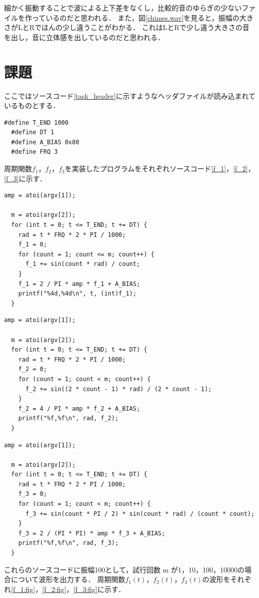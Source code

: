 \documentclass[titlepage]{jarticle}
\begin{document}
細かく振動することで波による上下差をなくし，比較的音のゆらぎの少ないファイルを作っているのだと思われる．
また，図\ref{chimes.wav}を見ると，振幅の大きさがLとRでほんの少し違うことがわかる．
これはLとRで少し違う大きさの音を出し，音に立体感を出しているのだと思われる．

\section{課題}
ここではソースコード\ref{task_header}に示すようなヘッダファイルが読み込まれているものとする．
\begin{lstlisting}[caption=課題のヘッダファイル,label=task_header]
  #define T_END 1000
  #define DT 1
  #define A_BIAS 0x80
  #define FRQ 3
\end{lstlisting}
周期関数$f_{1}$，$f_{2}$，$f_{3}$を実装したプログラムをそれぞれソースコード\ref{f_1}，\ref{f_2}，\ref{f_3}に示す．
\begin{lstlisting}[caption=周期関数$f_{1}(t)$の主要部,label=f_1]
  amp = atoi(argv[1]);

  m = atoi(argv[2]);
  for (int t = 0; t <= T_END; t += DT) {
    rad = t * FRQ * 2 * PI / 1000;
    f_1 = 0;
    for (count = 1; count <= m; count++) {
      f_1 += sin(count * rad) / count;
    }
    f_1 = 2 / PI * amp * f_1 + A_BIAS;
    printf("%4d,%4d\n", t, (int)f_1);
  }
\end{lstlisting}
\begin{lstlisting}[caption=周期関数$f_{2}(t)$の主要部,label=f_2]
  amp = atoi(argv[1]);

  m = atoi(argv[2]);
  for (int t = 0; t <= T_END; t += DT) {
    rad = t * FRQ * 2 * PI / 1000;
    f_2 = 0;
    for (count = 1; count < m; count++) {
      f_2 += sin((2 * count - 1) * rad) / (2 * count - 1);
    }
    f_2 = 4 / PI * amp * f_2 + A_BIAS;
    printf("%f,%f\n", rad, f_2);
  }
\end{lstlisting}
\begin{lstlisting}[caption=周期関数$f_{3}(t)$の主要部,label=f_3]
  amp = atoi(argv[1]);

  m = atoi(argv[2]);
  for (int t = 0; t <= T_END; t += DT) {
    rad = t * FRQ * 2 * PI / 1000;
    f_3 = 0;
    for (count = 1; count < m; count++) {
      f_3 += sin(count * PI / 2) * sin(count * rad) / (count * count);
    }
    f_3 = 2 / (PI * PI) * amp * f_3 + A_BIAS;
    printf("%f,%f\n", rad, f_3);
  }
\end{lstlisting}
これらのソースコードに振幅100として，試行回数 m が1，10，100，10000の場合について波形を出力する．
周期関数$f_{1}(t)$，$f_{2}(t)$，$f_{3}(t)$の波形をそれぞれ\ref{f_1:fig}，\ref{f_2:fig}，\ref{f_3:fig}に示す．
\end{document}
